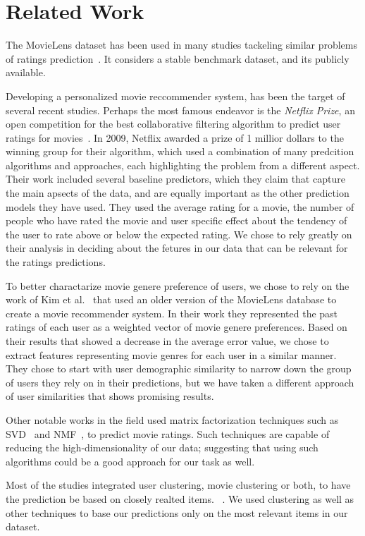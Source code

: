 \section{Related Work}

The MovieLens dataset has been used in many studies tackeling similar problems of ratings prediction~\cite{5575081, zhang2006learning}. It considers a stable benchmark dataset, and its publicly available. 

Developing a personalized movie reccommender system, has been the target of several recent studies. Perhaps the most famous endeavor is the \textit{Netflix Prize}, an open competition for the best collaborative filtering algorithm to predict user ratings for movies~\cite{bell2007bellkor}. In 2009, Netflix awarded a prize of 1 millior dollars to the winning group for their algorithm, which used a combination of many predcition algorithms and approaches, each highlighting the problem from a different aspect. Their work included several baseline predictors, which they claim that capture the main apsects of the data, and are equally important as the other prediction models they have used. They used the average rating for a movie, the number of people who have rated the movie and user specific effect about the tendency of the user to rate above or below the expected rating. We chose to rely greatly on their analysis in deciding about the fetures in our data that can be relevant for the ratings predictions. 

To better charactarize movie genere preference of users, we chose to rely on the work of Kim et al.~\cite{5575081} that used an older version of the MovieLens database to create a movie recommender system. In their work they represented the past ratings of each user as a weighted vector of movie genere preferences. Based on their results that showed a decrease in the average error value, we chose to extract features representing movie genres for each user in a similar manner. They chose to start with user demographic similarity to narrow down the group of users they rely on in their predictions, but we have taken a different approach of user similarities that shows promising results. 

Other notable works in the field used matrix factorization techniques such as SVD~\cite{koren2009matrix, zhang2006learning} and NMF~\cite{nguyen2012modified, zhang2006learning}, to predict movie ratings. Such techniques are capable of reducing the high-dimensionality of our data; suggesting that using such algorithms could be a good approach for our task as well. 

Most of the studies integrated user clustering, movie clustering or both, to have the prediction be based on closely realted items. ~\cite{bell2007bellkor, 5575081, kim2012recommender}. We used clustering as well as other techniques to base our predictions only on the most relevant items in our dataset.